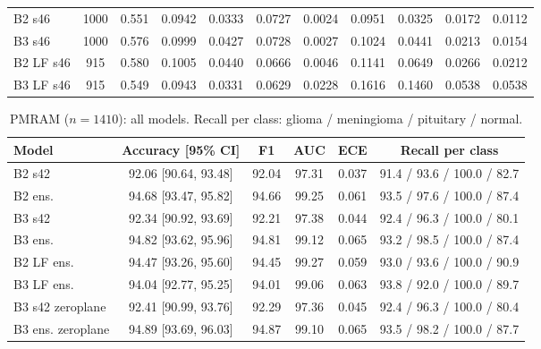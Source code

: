 \begin{table}[!ht]
\begin{tabular}{lcccccccccc}
B2 s46 & 1000 & 0.551 & 0.0942 & 0.0333 & 0.0727 & 0.0024 & 0.0951 & 0.0325 & 0.0172 & 0.0112 \\
B3 s46 & 1000 & 0.576 & 0.0999 & 0.0427 & 0.0728 & 0.0027 & 0.1024 & 0.0441 & 0.0213 & 0.0154 \\
B2 LF s46 & 915 & 0.580 & 0.1005 & 0.0440 & 0.0666 & 0.0046 & 0.1141 & 0.0649 & 0.0266 & 0.0212 \\
B3 LF s46 & 915 & 0.549 & 0.0943 & 0.0331 & 0.0629 & 0.0228 & 0.1616 & 0.1460 & 0.0538 & 0.0538 \\
\bottomrule
\end{tabular}
\end{table}

\begin{table}[!ht]
\centering
\scriptsize
\caption{PMRAM ($n=1410$): all models. Recall per class: glioma / meningioma / pituitary / normal.}
\label{tab:s-external}
\begin{tabular}{lccccc}
\toprule
Model & Accuracy [95\% CI] & F1 & AUC & ECE & Recall per class \\
\midrule
B2 s42 & 92.06 [90.64, 93.48] & 92.04 & 97.31 & 0.037 & 91.4 / 93.6 / 100.0 / 82.7 \\
B2 ens. & 94.68 [93.47, 95.82] & 94.66 & 99.25 & 0.061 & 93.5 / 97.6 / 100.0 / 87.4 \\
B3 s42 & 92.34 [90.92, 93.69] & 92.21 & 97.38 & 0.044 & 92.4 / 96.3 / 100.0 / 80.1 \\
B3 ens. & 94.82 [93.62, 95.96] & 94.81 & 99.12 & 0.065 & 93.2 / 98.5 / 100.0 / 87.4 \\
B2 LF ens. & 94.47 [93.26, 95.60] & 94.45 & 99.27 & 0.059 & 93.0 / 93.6 / 100.0 / 90.9 \\
B3 LF ens. & 94.04 [92.77, 95.25] & 94.01 & 99.06 & 0.063 & 93.8 / 92.0 / 100.0 / 89.7 \\
B3 s42 zeroplane & 92.41 [90.99, 93.76] & 92.29 & 97.36 & 0.045 & 92.4 / 96.3 / 100.0 / 80.4 \\
B3 ens. zeroplane & 94.89 [93.69, 96.03] & 94.87 & 99.10 & 0.065 & 93.5 / 98.2 / 100.0 / 87.7 \\
\bottomrule
\end{tabular}
\end{table}

